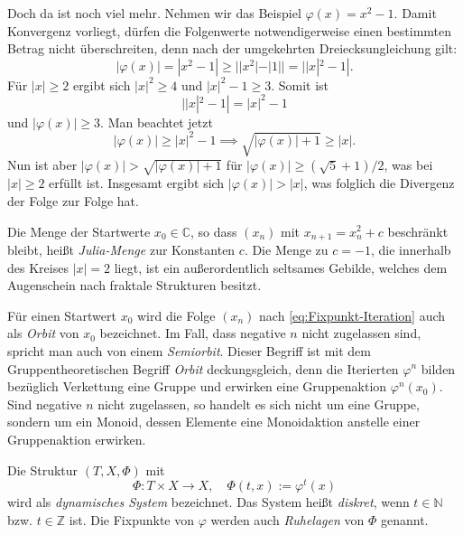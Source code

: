 \documentclass[a4paper,11pt,fleqn,twoside]{scrartcl}
\numberwithin{equation}{section}
\newcommand{\N}{\mathbb N}
\newcommand{\Z}{\mathbb Z}
\newcommand{\C}{\mathbb C}
\newcommand{\strong}[1]{{\sf\bfseries #1}}
\newenvironment{Definition}{\strong{Definition.}}{\par}
\begin{document}
Doch da ist noch viel mehr. Nehmen wir das Beispiel
$\varphi(x)=x^2-1$. Damit Konvergenz vorliegt, dürfen die Folgenwerte
notwendigerweise einen bestimmten Betrag nicht überschreiten, denn
nach der umgekehrten Dreiecksungleichung gilt:
\begin{equation}
|\varphi(x)| = |x^2-1| \ge ||x^2|-|1|| = ||x|^2-1|.
\end{equation}
Für $|x|\ge 2$ ergibt sich $|x|^2\ge 4$ und $|x|^2-1\ge 3$.
Somit ist
\begin{equation}
||x|^2-1| = |x|^2-1
\end{equation}
und $|\varphi(x)|\ge 3$.
Man beachtet jetzt
\begin{equation}
|\varphi(x)|\ge |x|^2-1 \implies \sqrt{|\varphi(x)|+1}\ge |x|.
\end{equation}
Nun ist aber $|\varphi(x)|>\sqrt{|\varphi(x)|+1}$ für
$|\varphi(x)|\ge (\sqrt{5}+1)/2$, was bei $|x|\ge 2$ erfüllt ist.
Insgesamt ergibt sich $|\varphi(x)|>|x|$, was folglich die Divergenz
der Folge zur Folge hat.

Die Menge der Startwerte $x_0\in\C$, so dass
$(x_n)$ mit $x_{n+1}=x_n^2+c$ beschränkt bleibt,
heißt \emph{Julia-Menge} zur Konstanten $c$. Die Menge zu $c=-1$,
die innerhalb des Kreises $|x|=2$ liegt, ist ein außerordentlich
seltsames Gebilde, welches dem Augenschein nach
fraktale Strukturen besitzt.

Für einen Startwert $x_0$ wird die Folge $(x_n)$ nach
\eqref{eq:Fixpunkt-Iteration} auch als \emph{Orbit}
von $x_0$ bezeichnet. Im Fall, dass negative $n$ nicht zugelassen
sind, spricht man auch von einem \emph{Semiorbit}. Dieser Begriff
ist mit dem Gruppentheoretischen Begriff \emph{Orbit} deckungsgleich,
denn die Iterierten $\varphi^n$ bilden bezüglich Verkettung
eine Gruppe und erwirken eine Gruppenaktion $\varphi^n(x_0)$.
Sind negative $n$ nicht zugelassen,
so handelt es sich nicht um eine Gruppe, sondern um ein Monoid,
dessen Elemente eine Monoidaktion anstelle einer Gruppenaktion
erwirken.

\begin{Definition}
Die Struktur $(T,X,\Phi)$ mit
\begin{equation}
\Phi\colon T\times X\to X,\quad\Phi(t,x):=\varphi^t(x)
\end{equation}
wird als \emph{dynamisches System} bezeichnet. Das System heißt
\emph{diskret}, wenn $t\in\N$ bzw. $t\in\Z$ ist. Die Fixpunkte
von $\varphi$ werden auch \emph{Ruhelagen} von $\Phi$ genannt.
\end{Definition}
\end{document}
